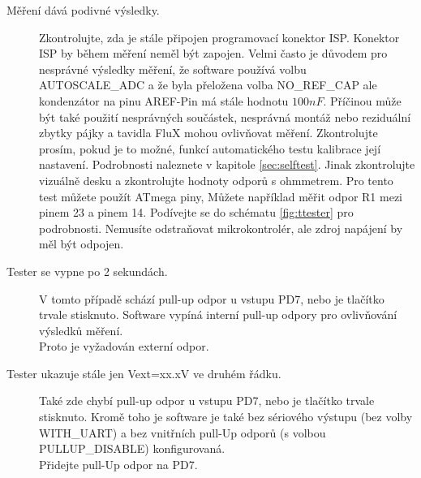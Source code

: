 \begin{description}
\item[Měření dává podivné výsledky.]  
Zkontrolujte, zda je stále připojen programovací konektor ISP. Konektor ISP by během měření neměl být zapojen.
Velmi často je důvodem pro nesprávné výsledky měření, že software používá volbu
AUTOSCALE\_ADC a že byla přeložena volba NO\_REF\_CAP ale kondenzátor na pinu AREF-Pin má stále
hodnotu \(100nF\).
Příčinou může být také použití nesprávných součástek,
nesprávná montáž nebo reziduální zbytky pájky a tavidla FluX mohou ovlivňovat měření.
Zkontrolujte prosím, pokud je to možné, funkcí automatického testu kalibrace její nastavení.
Podrobnosti naleznete v kapitole \ref{sec:selftest}.
Jinak zkontrolujte vizuálně desku a zkontrolujte hodnoty odporů s ohmmetrem.
Pro tento test můžete použít ATmega piny,
Můžete například měřit odpor R1 mezi pinem 23 a pinem 14.
Podívejte se do schématu \ref{fig:ttester} pro podrobnosti.
Nemusíte odstraňovat mikrokontrolér, ale zdroj napájení by měl být odpojen.

\item[Tester se vypne po 2 sekundách.]  
V tomto případě schází pull-up odpor u vstupu PD7, nebo je tlačítko trvale stisknuto.
Software vypíná interní pull-up odpory pro ovlivňování výsledků měření.\\ Proto je vyžadován externí odpor.

\item[Tester ukazuje stále jen Vext=xx.xV ve druhém řádku.]
Také zde chybí pull-up odpor u vstupu PD7, nebo je tlačítko trvale stisknuto.
Kromě toho je software je také bez sériového výstupu (bez volby WITH\_UART) a bez vnitřních
pull-Up odporů (s volbou PULLUP\_DISABLE) konfigurovaná.\\
Přidejte pull-Up odpor na PD7.

\end{description}
